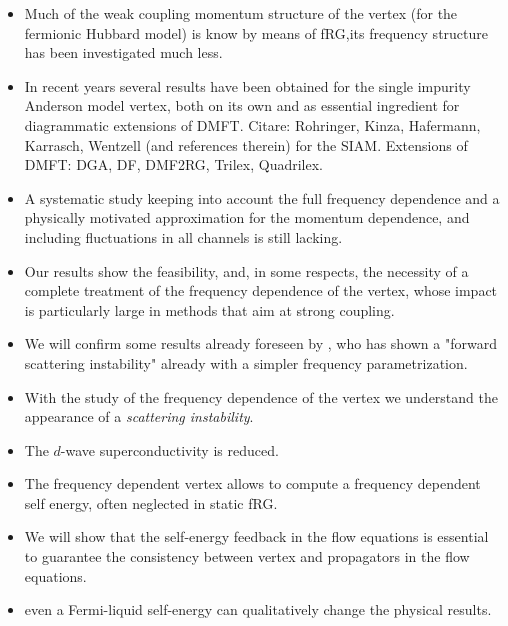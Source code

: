 \begin{itemize}
\item Much of the weak coupling momentum structure of the vertex (for the fermionic Hubbard model) is know by means of fRG,its frequency structure has been investigated much less. 
\item In recent years several results have been obtained for the single impurity Anderson model vertex, both on its own and as essential ingredient for diagrammatic extensions of DMFT. 
Citare: Rohringer, Kinza, Hafermann, Karrasch, Wentzell (and references therein) for the SIAM. Extensions of DMFT: DGA, DF, DMF2RG, Trilex, Quadrilex. 
\item A systematic study keeping into account the full frequency dependence and a physically motivated approximation for the momentum dependence, and including fluctuations in all channels is still lacking.

\item Our results show the feasibility, and, in some respects, the necessity  of a complete treatment of the frequency dependence of the vertex, whose impact is particularly large in methods that aim at strong coupling.
\item We will confirm some results already foreseen by , who has shown a "forward scattering instability" already with a simpler frequency parametrization.
\item With the study of the frequency dependence of the vertex we understand the appearance of a \textit{scattering instability}.
\item The $d$-wave superconductivity is reduced.  

\item The frequency dependent vertex allows to compute a frequency dependent self energy, often neglected in static fRG.   
\item We will show that the self-energy feedback in the flow equations is essential to guarantee the consistency between vertex and propagators in the flow equations.
\item even a Fermi-liquid self-energy can qualitatively change the physical results. 
\end{itemize}